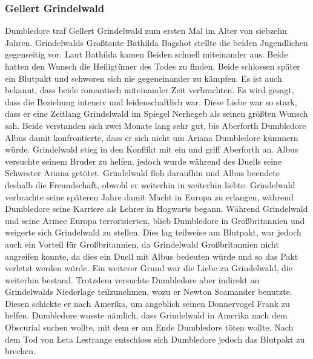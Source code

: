 \documentclass[a4paper, 10pt]{article}
\begin{document}
\subsubsection*{\large Gellert Grindelwald}
Dumbledore traf Gellert Grindelwald zum ersten Mal im Alter von siebzehn Jahren. Grindelwalds Großtante Bathilda Bagshot stellte die beiden Jugendlichen gegenseitig vor. Laut Bathilda kamen Beiden schnell miteinander aus. Beide hatten den Wunsch die Heiligtümer des Todes zu finden. Beide schlossen später ein Blutpakt und schworen sich nie gegeneinander zu kämpfen. Es ist auch bekannt, dass beide romantisch miteinander Zeit verbrachten. Es wird gesagt, dass die Beziehung intensiv und leidenschaftlich war. Diese Liebe war so stark, dass er eine Zeitlang Grindelwald im Spiegel Nerhegeb als seinen größten Wunsch sah.
\vspace{10pt}
\newline
{}  
Beide verstanden sich zwei Monate lang sehr gut, bis Aberforth Dumbledore Albus damit konfrontierte, dass er sich nicht um Ariana Dumbledore kümmern würde. Grindelwald stieg in den Konflikt mit ein und griff Aberforth an. Albus versuchte seinem Bruder zu helfen, jedoch wurde während des Duells seine Schwester Ariana getötet. Grindelwald floh daraufhin und Albus beendete deshalb die Freundschaft, obwohl er weiterhin in weiterhin liebte.
\vspace{10pt}
\newline
{}  
Grindelwald verbrachte seine späteren Jahre damit Macht in Europa zu erlangen, während Dumbledore seine Karriere als Lehrer in Hogwarts begann. Während Grindelwald und seine Armee Europa terrorisierten, blieb Dumbledore in Großbritannien und weigerte sich Grindelwald zu stellen. Dies lag teilweise am Blutpakt, war jedoch auch ein Vorteil für Großbritannien, da Grindelwald Großbritannien nicht angreifen konnte, da dies ein Duell mit Albus bedeuten würde und so das Pakt verletzt werden würde. Ein weiterer Grund war die Liebe zu Grindelwald, die weiterhin bestand. Trotzdem versuchte Dumbledore aber indirekt an Grindelwalds Niederlage teilzunehmen, wozu er Newton Scamander benutzte. Diesen schickte er nach Amerika, um angeblich seinen Donnervogel Frank zu helfen. Dumbledore wusste nämlich, dass Grindelwald in Amerika nach dem Obscurial suchen wollte, mit dem er am Ende Dumbledore töten wollte. Nach dem Tod von Leta Lestrange entschloss sich Dumbledore jedoch das Blutpakt zu brechen.
\vspace{10pt}
\newline
\end{document}

